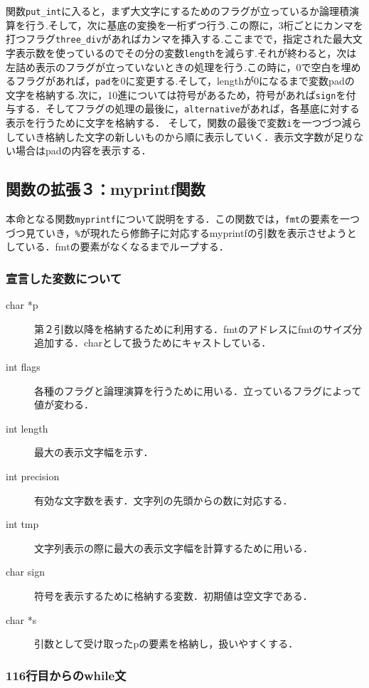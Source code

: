 \documentclass[a4j,11pt]{jarticle}
\begin{document}
関数\verb|put_int|に入ると，まず大文字にするためのフラグが立っているか論理積演算を行う.そして，次に基底の変換を一桁ずつ行う.この際に，3桁ごとにカンマを打つフラグ\verb|three_div|があればカンマを挿入する.ここまでで，指定された最大文字表示数を使っているのでその分の変数\verb|length|を減らす.それが終わると，次は左詰め表示のフラグが立っていないときの処理を行う.この時に，0で空白を埋めるフラグがあれば，\verb|pad|を$0$に変更する.そして，lengthが0になるまで変数padの文字を格納する.次に，10進については符号があるため，符号があれば\verb|sign|を付与する．そしてフラグの処理の最後に，\verb|alternative|があれば，各基底に対する表示を行うために文字を格納する．
そして，関数の最後で変数\verb|i|を一つづつ減らしていき格納した文字の新しいものから順に表示していく．表示文字数が足りない場合はpadの内容を表示する．

\subsection{関数の拡張３：myprintf関数}
本命となる関数\verb|myprintf|について説明をする．この関数では，\verb|fmt|の要素を一つづつ見ていき，\verb|%|が現れたら修飾子に対応するmyprintfの引数を表示させようとしている．fmtの要素がなくなるまでループする．

\subsubsection{宣言した変数について}
\begin{description}
\item[char *p] 第２引数以降を格納するために利用する．fmtのアドレスにfmtのサイズ分追加する．charとして扱うためにキャストしている．
\item[int flags] 各種のフラグと論理演算を行うために用いる．立っているフラグによって値が変わる．
\item[int length] 最大の表示文字幅を示す．
\item[int precision] 有効な文字数を表す．文字列の先頭からの数に対応する．
\item[int tmp] 文字列表示の際に最大の表示文字幅を計算するために用いる．
\item[char sign] 符号を表示するために格納する変数．初期値は空文字である．
\item[char *s] 引数として受け取ったpの要素を格納し，扱いやすくする．    
\end{description}
\subsubsection{116行目からのwhile文}
\end{document}

